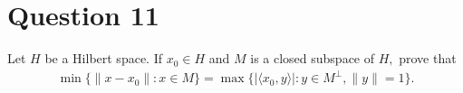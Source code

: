 \section{Question 11}

\horz
Let $H$ be a Hilbert space. If $x_0\in H$ and $M$ is a closed subspace of $H,$ prove that
\begin{align*}
\min \{\|x-x_0\| : x\in M\} = \max \{ |\langle x_0,y\rangle | : y\in M^{\perp},\|y\|=1\}.
\end{align*}
\horz
